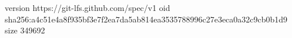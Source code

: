 version https://git-lfs.github.com/spec/v1
oid sha256:a4c51e4a8f935bf3e7f2ea7da5ab814ea3535788996c27e3eca0a32c9cb0b1d9
size 349692
